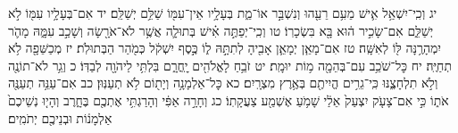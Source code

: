 \documentclass[twoside, openany, parskip=half, 11pt]{book}
\begin{document}
יג וְכִֽי־יִשְׁאַ֥ל אִ֛ישׁ מֵעִ֥ם רֵעֵ֖הוּ וְנִשְׁבַּ֣ר אוֹ־מֵ֑ת בְּעָלָ֥יו אֵין־עִמּ֖וֹ שַׁלֵּ֥ם יְשַׁלֵּֽם׃ יד אִם־בְּעָלָ֥יו עִמּ֖וֹ לֹ֣א יְשַׁלֵּ֑ם אִם־שָׂכִ֣יר ה֔וּא בָּ֖א בִּשְׂכָרֽוֹ׃
טו וְכִֽי־יְפַתֶּ֣ה אִ֗ישׁ בְּתוּלָ֛ה אֲשֶׁ֥ר לֹא־אֹרָ֖שָׂה וְשָׁכַ֣ב עִמָּ֑הּ מָהֹ֛ר יִמְהָרֶ֥נָּה לּ֖וֹ לְאִשָּֽׁה׃ טז אִם־מָאֵ֧ן יְמָאֵ֛ן אָבִ֖יהָ לְתִתָּ֣הּ ל֑וֹ כֶּ֣סֶף יִשְׁקֹ֔ל כְּמֹ֖הַר הַבְּתוּלֹֽת׃
יז מְכַשֵּׁפָ֖ה לֹ֥א תְחַיֶּֽה׃ יח כׇּל־שֹׁכֵ֥ב עִם־בְּהֵמָ֖ה מ֥וֹת יוּמָֽת׃
יט זֹבֵ֥חַ לָאֱלֹהִ֖ים יׇֽחֳרָ֑ם בִּלְתִּ֥י לַיהֹוָ֖ה לְבַדּֽוֹ׃ כ וְגֵ֥ר לֹא־תוֹנֶ֖ה וְלֹ֣א תִלְחָצֶ֑נּוּ כִּֽי־גֵרִ֥ים הֱיִיתֶ֖ם בְּאֶ֥רֶץ מִצְרָֽיִם׃ כא כׇּל־אַלְמָנָ֥ה וְיָת֖וֹם לֹ֥א תְעַנּֽוּן׃ כב אִם־עַנֵּ֥ה תְעַנֶּ֖ה אֹת֑וֹ כִּ֣י אִם־צָעֹ֤ק יִצְעַק֙ אֵלַ֔י שָׁמֹ֥עַ אֶשְׁמַ֖ע צַעֲקָתֽוֹ׃ כג וְחָרָ֣ה אַפִּ֔י וְהָרַגְתִּ֥י אֶתְכֶ֖ם בֶּחָ֑רֶב וְהָי֤וּ נְשֵׁיכֶם֙ אַלְמָנ֔וֹת וּבְנֵיכֶ֖ם יְתֹמִֽים׃
\end{document}
